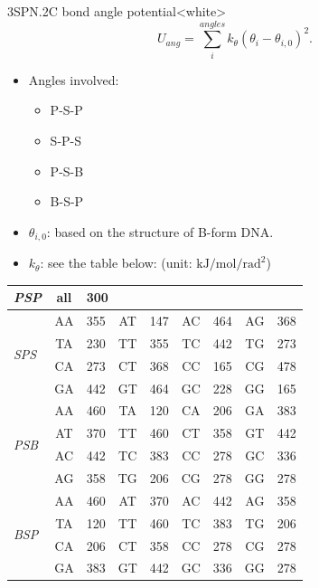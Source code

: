\begin{smallpage}{3SPN.2C bond angle potential}<white>
  \begin{equation}
    \label{eq:dna_3spn2c_local_angle}
    U_{ang} = \sum_{i}^{angles} k_\theta (\theta_i - \theta_{i,0})^2.
  \end{equation}
  \tcblower
  \begin{itemize}
  \item Angles involved:
    \begin{itemize}
    \item P-S-P
    \item S-P-S
    \item P-S-B
    \item B-S-P
    \end{itemize}
  \item $\theta_{i, 0}$: based on the structure of B-form DNA.
  \item $k_\theta$: see the table below: (unit: $\mathrm{kJ/mol/rad^2}$)
  \end{itemize}
  \begin{center}
    \begin{tabular}{l|cl|cl|cl|cl}
      \toprule
      \emph{PSP} & all & \multicolumn{7}{l}{300}\\
      \midrule
      \multirow{4}{*}{\emph{SPS}} &
                                    AA & 355 & AT & 147 & AC & 464 & AG & 368 \\
                 & TA & 230 & TT & 355 & TC & 442 & TG & 273 \\
                 & CA & 273 & CT & 368 & CC & 165 & CG & 478 \\
                 & GA & 442 & GT & 464 & GC & 228 & GG & 165 \\
      \midrule
      \multirow{4}{*}{\emph{PSB}} &
                                    AA & 460 & TA & 120 & CA & 206 & GA & 383 \\
                 & AT & 370 & TT & 460 & CT & 358 & GT & 442 \\
                 & AC & 442 & TC & 383 & CC & 278 & GC & 336 \\
                 & AG & 358 & TG & 206 & CG & 278 & GG & 278 \\
      \midrule
      \multirow{4}{*}{\emph{BSP}} &
                                    AA & 460 & AT & 370 & AC & 442 & AG & 358 \\
                 & TA & 120 & TT & 460 & TC & 383 & TG & 206 \\
                 & CA & 206 & CT & 358 & CC & 278 & CG & 278 \\
                 & GA & 383 & GT & 442 & GC & 336 & GG & 278 \\
      \bottomrule
    \end{tabular}
  \end{center}
\end{smallpage}

